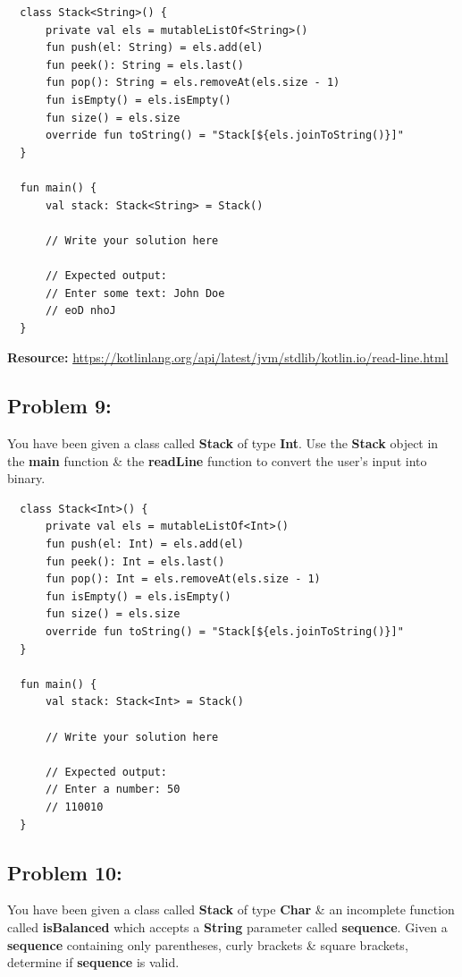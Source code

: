 \documentclass{article}
\begin{document}
\begin{verbatim}
  class Stack<String>() {
      private val els = mutableListOf<String>()
      fun push(el: String) = els.add(el)
      fun peek(): String = els.last()
      fun pop(): String = els.removeAt(els.size - 1)
      fun isEmpty() = els.isEmpty()
      fun size() = els.size
      override fun toString() = "Stack[${els.joinToString()}]"
  }

  fun main() {
      val stack: Stack<String> = Stack()

      // Write your solution here

      // Expected output:
      // Enter some text: John Doe
      // eoD nhoJ
  }
\end{verbatim}

\textbf{Resource:} \href{https://kotlinlang.org/api/latest/jvm/stdlib/kotlin.io/read-line.html}{https://kotlinlang.org/api/latest/jvm/stdlib/kotlin.io/read-line.html}

\subsection*{Problem 9:}
You have been given a class called \textbf{Stack} of type \textbf{Int}. Use the \textbf{Stack} object in the \textbf{main} function \& the \textbf{readLine} function to convert the user's input into binary. 

\begin{verbatim}
  class Stack<Int>() {
      private val els = mutableListOf<Int>()
      fun push(el: Int) = els.add(el)
      fun peek(): Int = els.last()
      fun pop(): Int = els.removeAt(els.size - 1)
      fun isEmpty() = els.isEmpty()
      fun size() = els.size
      override fun toString() = "Stack[${els.joinToString()}]"
  }

  fun main() {
      val stack: Stack<Int> = Stack()

      // Write your solution here

      // Expected output:
      // Enter a number: 50
      // 110010
  }
\end{verbatim}

\subsection*{Problem 10:}
You have been given a class called \textbf{Stack} of type \textbf{Char} \& an incomplete function called \textbf{isBalanced} which accepts a \textbf{String} parameter called \textbf{sequence}. Given a \textbf{sequence} containing only parentheses, curly brackets \& square brackets, determine if \textbf{sequence} is valid.
\end{document}
